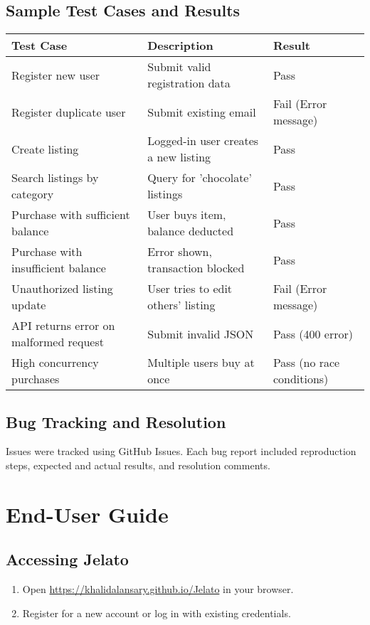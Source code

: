 \documentclass[12pt,a4paper]{report}
\begin{document}
\section{Sample Test Cases and Results}
\begin{longtable}{|p{}|p{}|p{}|}
    \hline
    \textbf{Test Case} & \textbf{Description} & \textbf{Result} \\
    \hline
    Register new user & Submit valid registration data & Pass \\
    Register duplicate user & Submit existing email & Fail (Error message) \\
    Create listing & Logged-in user creates a new listing & Pass \\
    Search listings by category & Query for 'chocolate' listings & Pass \\
    Purchase with sufficient balance & User buys item, balance deducted & Pass \\
    Purchase with insufficient balance & Error shown, transaction blocked & Pass \\
    Unauthorized listing update & User tries to edit others' listing & Fail (Error message) \\
    API returns error on malformed request & Submit invalid JSON & Pass (400 error) \\
    High concurrency purchases & Multiple users buy at once & Pass (no race conditions) \\
    \hline
\end{longtable}

\section{Bug Tracking and Resolution}
Issues were tracked using GitHub Issues. Each bug report included reproduction steps, expected and actual results, and resolution comments.

\chapter{End-User Guide}
\section{Accessing Jelato}
\begin{enumerate}
    \item Open \url{https://khalidalansary.github.io/Jelato} in your browser.
    \item Register for a new account or log in with existing credentials.
\end{enumerate}
\end{document}
